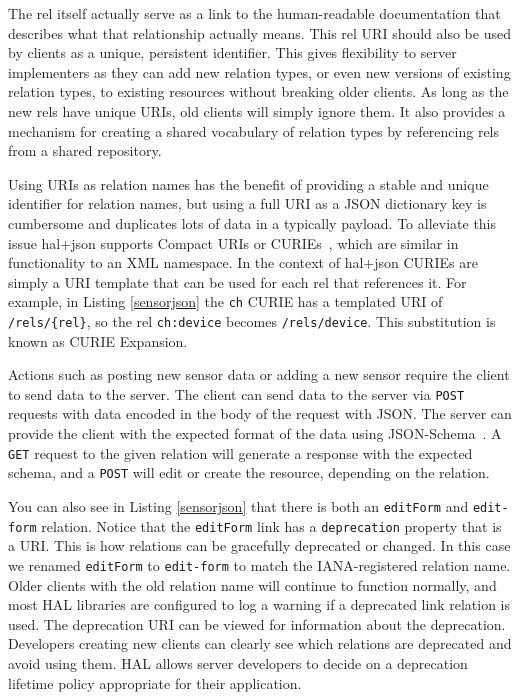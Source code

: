 \documentclass{acm_proc_article-sp}
\begin{document}
The rel itself actually serve as a link to the human-readable documentation
that describes what that relationship actually means. This rel URI should also
be used by clients as a unique, persistent identifier. This gives flexibility
to server implementers as they can add new relation types, or even new versions
of existing relation types, to existing resources without breaking older
clients. As long as the new rels have unique URIs, old clients will simply
ignore them. It also provides a mechanism for creating a shared vocabulary of
relation types by referencing rels from a shared repository.

Using URIs as relation names has the benefit of providing a stable and unique
identifier for relation names, but using a full URI as a JSON dictionary key is
cumbersome and duplicates lots of data in a typically payload. To alleviate this
issue hal+json supports Compact URIs or CURIEs~\cite{curies}, which are similar in
functionality to an XML namespace. In the context of hal+json CURIEs are simply
a URI template that can be used for each rel that references it. For example,
in Listing \ref{sensorjson} the \texttt{ch} CURIE has a templated URI of
\texttt{/rels/\{rel\}}, so the rel \texttt{ch:device} becomes
\texttt{/rels/device}. This substitution is known as CURIE Expansion.

Actions such as posting new sensor data or adding a new sensor require the
client to send data to the server. The client can send data to the server via
\texttt{POST} requests with data encoded in the body of the request with JSON.
The server can provide the client with the expected format of the data using
JSON-Schema~\cite{json-schema-draft}. A \texttt{GET} request to the given
relation will generate a response with the expected schema, and a \texttt{POST}
will edit or create the resource, depending on the relation.

You can also see in Listing \ref{sensorjson} that there is both an
\mbox{\texttt{editForm}} and \texttt{edit-form} relation. Notice that the
\texttt{editForm} link has a \texttt{deprecation} property that is a URI.  This
is how relations can be gracefully deprecated or changed. In this case we
renamed \texttt{editForm} to \texttt{edit-form} to match the IANA-registered
relation name. Older clients with the old relation name will continue to
function normally, and most HAL libraries are configured to log a warning if a
deprecated link relation is used. The deprecation URI can be viewed for
information about the deprecation. Developers creating new clients can clearly
see which relations are deprecated and avoid using them. HAL allows server
developers to decide on a deprecation lifetime policy appropriate for their
application.
\end{document}
